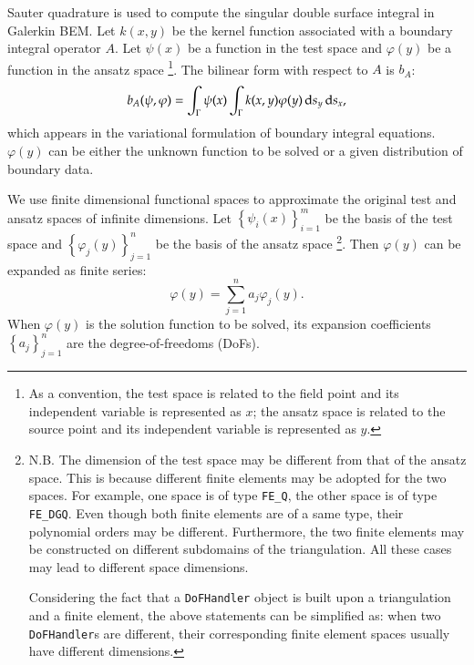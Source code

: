 \documentclass[11pt, a4paper]{book}
\begin{document}
Sauter quadrature is used to compute the singular double surface integral in Galerkin BEM.
Let $k(x,y)$ be the kernel function associated with a boundary integral operator $A$. Let
$\psi(x)$ be a function in the test space and $\varphi(y)$ be a function in the ansatz
space \footnote{As a convention, the test space is related to the field point and its
  independent variable is represented as $x$; the ansatz space is related to the source
  point and its independent variable is represented as $y$.}. The bilinear form with
respect to $A$ is $b_A$:
\begin{equation}
  \label{eq:bem-bilinear-form-general}
  b_A(\psi, \varphi) = \int_{\Gamma}\psi(x)\int_{\Gamma}k(x,y)\varphi(y) \,\mathrm{d} s_y \,\mathrm{d} s_x,
\end{equation}
which appears in the variational formulation of boundary integral equations. $\varphi(y)$
can be either the unknown function to be solved or a given distribution of boundary data.

We use finite dimensional functional spaces to approximate the original test and ansatz
spaces of infinite dimensions. Let $\left\{ \psi_i(x) \right\}_{i=1}^m$ be the basis of
the test space and $\left\{ \varphi_j(y) \right\}_{j=1}^n$ be the basis of the ansatz
space \footnote{N.B. The dimension of the test space may be different from that of the ansatz
  space. This is because different finite elements may be adopted for the two spaces. For
  example, one space is of type \texttt{FE\_Q}, the other space is of type
  \texttt{FE\_DGQ}. Even though both finite elements are of a same type, their polynomial
  orders may be different. Furthermore, the two finite elements may be constructed on
  different subdomains of the triangulation. All these cases may lead to different space
  dimensions.

  Considering the fact that a \texttt{DoFHandler} object is built upon a triangulation and
  a finite element, the above statements can be simplified as: when two
  \texttt{DoFHandler}s are different, their corresponding finite element spaces usually
  have different dimensions.}. Then $\varphi(y)$ can be expanded as finite series:
\begin{equation}
  \varphi(y) = \sum_{j=1}^n a_j\varphi_j(y).
\end{equation}
When $\varphi(y)$ is the solution function to be solved, its expansion coefficients
$\left\{ a_j \right\}_{j=1}^n$ are the degree-of-freedoms (DoFs).
\end{document}
